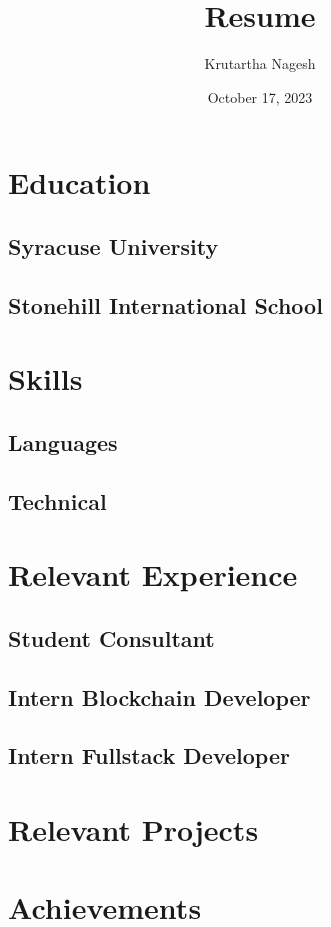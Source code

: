 \documentclass{article}
\title{Resume}
\author{Krutartha Nagesh}
\date{October 17, 2023}
\begin{document}
    \maketitle
    \section{Education}
        \subsection{Syracuse University}
        \subsection{Stonehill International School}
    \section{Skills}
        \subsection{Languages}
        \subsection{Technical}
    \section{Relevant Experience}
        \subsection{Student Consultant}
        \subsection{Intern Blockchain Developer}
        \subsection{Intern Fullstack Developer} 
    \section{Relevant Projects}
    \section{Achievements}
\end{document}

